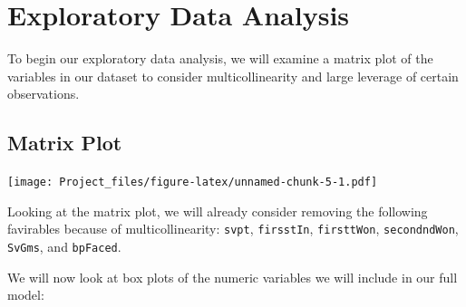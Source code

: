 \documentclass[]{article}
\newenvironment{Shaded}{\begin{snugshade}}{\end{snugshade}}
\newcommand{\DataTypeTok}[1]{\textcolor[rgb]{0.13,0.29,0.53}{#1}}
\newcommand{\DecValTok}[1]{\textcolor[rgb]{0.00,0.00,0.81}{#1}}
\newcommand{\KeywordTok}[1]{\textcolor[rgb]{0.13,0.29,0.53}{\textbf{#1}}}
\newcommand{\NormalTok}[1]{#1}
\newcommand{\OperatorTok}[1]{\textcolor[rgb]{0.81,0.36,0.00}{\textbf{#1}}}
\newcommand{\StringTok}[1]{\textcolor[rgb]{0.31,0.60,0.02}{#1}}
\begin{document}
\hypertarget{exploratory-data-analysis}{%
\section{Exploratory Data Analysis}\label{exploratory-data-analysis}}

To begin our exploratory data analysis, we will examine a matrix plot of
the variables in our dataset to consider multicollinearity and large
leverage of certain observations.

\hypertarget{matrix-plot}{%
\subsection{Matrix Plot}\label{matrix-plot}}

\begin{Shaded}
\end{Shaded}

\texttt{[image: Project\_files/figure-latex/unnamed-chunk-5-1.pdf]}

Looking at the matrix plot, we will already consider removing the
following favirables because of multicollinearity: \texttt{svpt},
\texttt{firsstIn}, \texttt{firsttWon}, \texttt{secondndWon},
\texttt{SvGms}, and \texttt{bpFaced}.

We will now look at box plots of the numeric variables we will include
in our full model:
\end{document}
